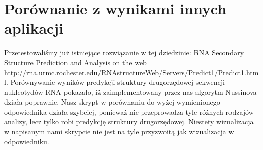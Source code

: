 
\normalfont \normalsize
\section{Porównanie z wynikami innych aplikacji}
Przetestowaliśmy już istniejące rozwiązanie w tej dziedzinie: RNA Secondary Structure Prediction and Analysis on the web http://rna.urmc.rochester.edu/RNAstructureWeb/Servers/Predict1/Predict1.html. Porównywanie wyników predykcji struktury drugorzędowej sekwencji nukleotydów RNA pokazało, iż zaimplementowany przez nas algorytm Nussinova działa poprawnie. Nasz skrypt w porównaniu do wyżej wymienionego odpowiednika działa szybciej, ponieważ nie przeprowadza tyle różnych rodzajów analizy, lecz tylko robi predykcję struktury drugorzędowej. Niestety wizualizacja w napisanym nami skrypcie nie jest na tyle przyzwoitą jak wizualizacja w odpowiedniku. 


